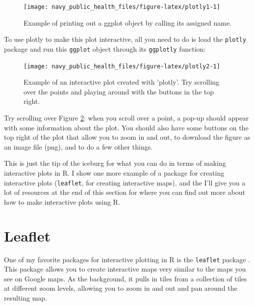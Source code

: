 \documentclass[]{tufte-book}
\newenvironment{Shaded}{}{}
\newcommand{\KeywordTok}[1]{\textcolor[rgb]{0.00,0.44,0.13}{\textbf{#1}}}
\newcommand{\NormalTok}[1]{#1}
\newcommand{\OperatorTok}[1]{\textcolor[rgb]{0.40,0.40,0.40}{#1}}
\newcommand{\StringTok}[1]{\textcolor[rgb]{0.25,0.44,0.63}{#1}}
\begin{document}
\begin{figure}
\texttt{[image: navy\_public\_health\_files/figure-latex/plotly1-1]} \caption[Example of printing out a ggplot object by calling its assigned name]{Example of printing out a ggplot object by calling its assigned name.}\label{fig:plotly1}
\end{figure}

To use plotly to make this plot interactive, all you need to do is load the \texttt{plotly} package and
run this \texttt{ggplot} object
through its \texttt{ggplotly} function:

\begin{Shaded}
\end{Shaded}

\begin{figure}
\texttt{[image: navy\_public\_health\_files/figure-latex/plotly2-1]} \caption[Example of an interactive plot created with 'plotly']{Example of an interactive plot created with 'plotly'. Try scrolling over the points and playing around with the buttons in the top right.}\label{fig:plotly2}
\end{figure}

Try scrolling over Figure \ref{fig:plotly2}: when you scroll over a point, a pop-up should
appear with some information about the plot. You should also have some buttons on the top
right of the plot that allow you to zoom in and out, to download the figure as an image
file (png), and to do a few other things.

This is just the tip of the iceburg for what you can do in terms of making interactive plots
in R. I show one more example of a package for creating interactive plots (\texttt{leaflet}, for
creating interactive maps), and the I'll give you a lot of resources at the end of this
section for where you can find out more about how to make interactive plots using R.

\hypertarget{leaflet}{%
\section{Leaflet}\label{leaflet}}

One of my favorite packages for interactive plotting in R is the \texttt{leaflet} package \citep{R-leaflet}.
This package allows you to create interactive maps very similar to the maps you see on Google maps.
As the background, it pulls in tiles from a collection of tiles at different zoom levels, allowing
you to zoom in and out and pan around the resulting map.
\end{document}
